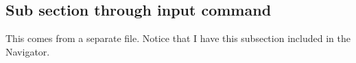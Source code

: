 \subsection{Sub section through input command}
This comes from a separate file. Notice that I have this subsection included in the Navigator. 